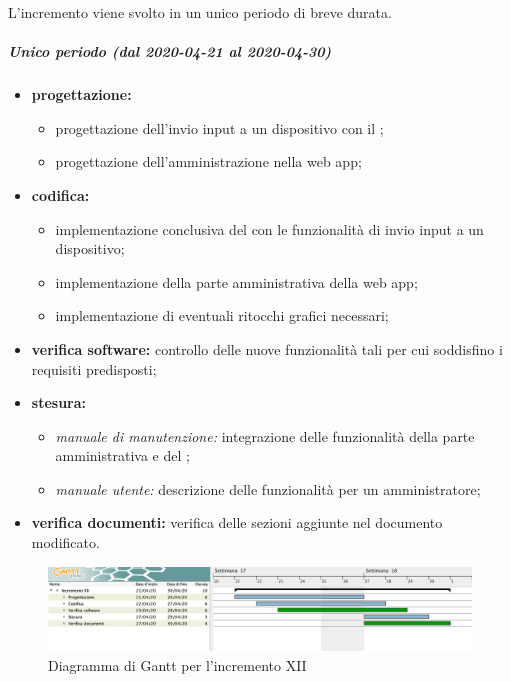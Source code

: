 				L'incremento viene svolto in un unico periodo di breve durata.
				
				\subparagraph{Unico periodo (dal 2020-04-21 al 2020-04-30)}
				
					\begin{itemize}
						\item \textbf{progettazione:} 
						\begin{itemize}
							\item progettazione dell'invio input a un dispositivo con il ;
							\item progettazione dell'amministrazione nella web app;
						\end{itemize}
						\item \textbf{codifica:} 
						\begin{itemize}
							\item implementazione conclusiva del  con le funzionalità di invio input a un dispositivo; 
							\item implementazione della parte amministrativa della web app;
							\item implementazione di eventuali ritocchi grafici necessari;
						\end{itemize}
						\item \textbf{verifica software:} controllo delle nuove funzionalità tali per cui soddisfino i requisiti predisposti;
						\item \textbf{stesura:} 
						\begin{itemize}
							\item \textit{manuale di manutenzione:} integrazione delle funzionalità della parte amministrativa e del ;
							\item \textit{manuale utente:} descrizione delle funzionalità per un amministratore;
						\end{itemize}
						\item \textbf{verifica documenti:} verifica delle sezioni aggiunte nel documento modificato.
					\end{itemize} 			

		\begin{landscape}
          \begin{figure}[H]
            \centering
            \includegraphics[width=\linewidth]{images/gantt/incrementoXII} %
            \caption{Diagramma di Gantt per l'incremento XII}
          \end{figure}		
		\end{landscape}

